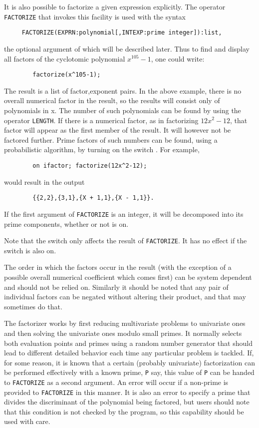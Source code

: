 \hypertarget{operator:FACTORIZE}{}
It is also possible to factorize a given expression explicitly.  The
operator \texttt{FACTORIZE} that invokes this facility is
used with the syntax
\begin{verbatim}
     FACTORIZE(EXPRN:polynomial[,INTEXP:prime integer]):list,
\end{verbatim}
the optional argument of which will be described later. Thus to find and
display all factors of the cyclotomic polynomial $x^{105}-1$, one could
write:
\begin{verbatim}
        factorize(x^105-1);
\end{verbatim}
The result is a list of factor,exponent pairs.
In the above example, there is no overall numerical factor in the result,
so the results will consist only of polynomials in x.  The number of such
polynomials can be found by using the operator \texttt{LENGTH}.
If there is a numerical factor, as in factorizing $12x^{2}-12$,
that factor will appear as the first member of the result.
It will however not be factored further.  Prime factors of such numbers
can be found, using a probabilistic algorithm, by turning on the switch
.  For example,
\begin{verbatim}
        on ifactor; factorize(12x^2-12);
\end{verbatim}
would result in the output
\begin{verbatim}
        {{2,2},{3,1},{X + 1,1},{X - 1,1}}.
\end{verbatim}

If the first argument of \texttt{FACTORIZE} is an integer, it will be
decomposed into its prime components, whether or not  is on.

Note that the  switch only affects the result of \texttt{FACTORIZE}.
It has no effect if the  switch is also on.

The order in which the factors occur in the result (with the exception of
a possible overall numerical coefficient which comes first) can be system
dependent and should not be relied on. Similarly it should be noted that
any pair of individual factors can be negated without altering their
product, and that {\REDUCE} may sometimes do that.

The factorizer works by first reducing multivariate problems to univariate
ones and then solving the univariate ones modulo small primes. It normally
selects both evaluation points and primes using a random number generator
that should lead to different detailed behavior each time any particular
problem is tackled. If, for some reason, it is known that a certain
(probably univariate) factorization can be performed effectively with a
known prime, \texttt{P} say, this value of \texttt{P} can be handed to
\texttt{FACTORIZE} as a second
argument. An error will occur if a non-prime is provided to \texttt{FACTORIZE} in
this manner. It is also an error to specify a prime that divides the
discriminant of the polynomial being factored, but users should note that
this condition is not checked by the program, so this capability should be
used with care.

